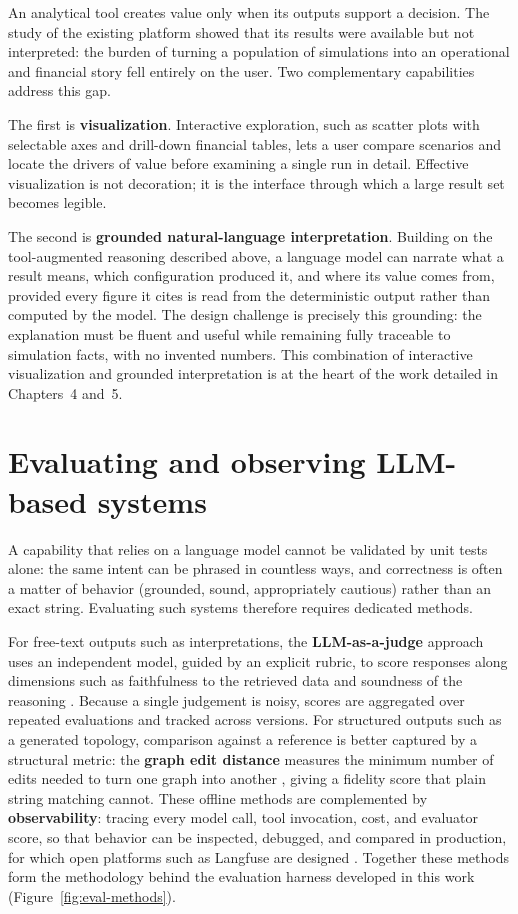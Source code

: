 An analytical tool creates value only when its outputs support a decision. The
study of the existing platform showed that its results were available but not
interpreted: the burden of turning a population of simulations into an
operational and financial story fell entirely on the user. Two complementary
capabilities address this gap.

The first is \textbf{visualization}. Interactive exploration, such as scatter
plots with selectable axes and drill-down financial tables, lets a user compare
scenarios and locate the drivers of value before examining a single run in
detail. Effective visualization is not decoration; it is the interface through
which a large result set becomes legible.

The second is \textbf{grounded natural-language interpretation}. Building on the
tool-augmented reasoning described above, a language model can narrate what a
result means, which configuration produced it, and where its value comes from,
provided every figure it cites is read from the deterministic output rather than
computed by the model. The design challenge is precisely this grounding: the
explanation must be fluent and useful while remaining fully traceable to
simulation facts, with no invented numbers. This combination of interactive
visualization and grounded interpretation is at the heart of the work
detailed in Chapters~4 and~5.

\section{Evaluating and observing LLM-based systems}
\label{sec:eval-foundations}

A capability that relies on a language model cannot be validated by unit tests
alone: the same intent can be phrased in countless ways, and correctness is often
a matter of behavior (grounded, sound, appropriately cautious) rather than an
exact string. Evaluating such systems therefore requires dedicated methods.

For free-text outputs such as interpretations, the \textbf{LLM-as-a-judge}
approach uses an independent model, guided by an explicit rubric, to score
responses along dimensions such as faithfulness to the retrieved data and
soundness of the reasoning \cite{zheng2023judge}. Because a single judgement is
noisy, scores are aggregated over repeated evaluations and tracked across
versions. For structured outputs such as a generated topology, comparison against
a reference is better captured by a structural metric: the \textbf{graph edit
distance} measures the minimum number of edits needed to turn one graph into
another \cite{sanfeliu1983}, giving a fidelity score that plain string matching
cannot. These offline methods are complemented by \textbf{observability}: tracing
every model call, tool invocation, cost, and evaluator score, so that behavior
can be inspected, debugged, and compared in production, for which open platforms
such as Langfuse are designed \cite{langfuse2025}. Together these methods form
the methodology behind the evaluation harness developed in this work
(Figure~\ref{fig:eval-methods}).


